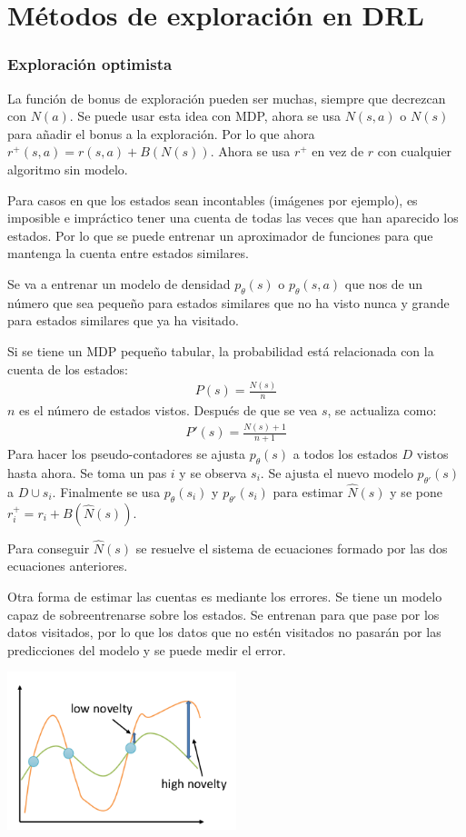 \section{Métodos de exploración en DRL}%
\label{sec:métodos_de_exploración_en_drl}

\subsubsection{Exploración optimista}%
\label{ssub:exploración_optimista}

La función de bonus de exploración pueden ser muchas, siempre que decrezcan con $N(a)$. Se puede
usar esta idea con MDP, ahora se usa  $N(s,a)$ o $N(s)$ para añadir el bonus a la exploración.
Por lo que ahora $r^+(s,a)=r(s,a)+B(N(s))$. Ahora se usa  $r^+$ en vez de $r$ con cualquier
algoritmo sin modelo.

Para casos en que los estados sean incontables (imágenes por ejemplo), es imposible e
impráctico tener una cuenta de todas las veces que han aparecido los estados. Por lo
que se puede entrenar un aproximador de funciones para que mantenga la cuenta entre estados
similares.

Se va a entrenar un modelo de densidad $p_\theta(s)$ o $p_\theta(s,a)$ que nos de un número que
sea pequeño para estados similares que no ha visto nunca y grande para estados similares que ya ha visitado. 

Si se tiene un MDP pequeño tabular, la probabilidad está relacionada con la cuenta de los
estados:
\begin{align}
    P(s)= \frac{N(s)}{n} 
\end{align}
$n$ es el número de estados vistos. Después de que se vea $s$, se actualiza como:
\begin{align}
    P'(s)= \frac{N(s)+1}{n+1} 
\end{align}
Para hacer los pseudo-contadores se ajusta $p_\theta(s)$ a todos los estados $D$ vistos hasta
ahora. Se toma un pas $i$ y se observa $s_i$. Se ajusta el nuevo modelo $p_{\theta'}(s)$ a
$D \cup s_i$. Finalmente se usa $p_\theta(s_i)$ y $p_{\theta'}(s_i)$ para estimar
$\hat{N}(s)$ y se pone $r^+_i=r_i+B(\hat{N}(s))$. 

Para conseguir $\hat{N}(s)$ se resuelve el sistema de ecuaciones formado por las dos ecuaciones
anteriores.

Otra forma de estimar las cuentas es mediante los errores. Se tiene un modelo capaz de
sobreentrenarse sobre los estados. Se entrenan para que pase por los datos visitados, por lo
que los datos que no estén visitados no pasarán por las predicciones del modelo y se puede
medir el error.

\begin{center}
\includegraphics[width=0.5\textwidth]{figures/2020-07-14-181819_342x235_scrot.png}
\end{center}
